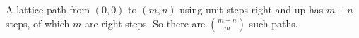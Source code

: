 A lattice path from $(0, 0)$ to $(m, n)$ using unit steps right and up has $m + n$ steps, of which $m$ are right steps.
So there are $\binom{m + n}{m}$ such paths.